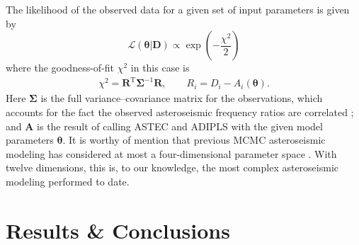 \documentclass[twocolumn]{aastex63}
\newif\ifref
\newcommand{\mb}[1]{\ifref\textcolor{darkred}{#1}\else #1\fi}
\newif\ifreff
\newcommand{\mbb}[1]{\ifreff\textcolor{darkred}{#1}\else #1\fi}
\begin{document}
The likelihood of the observed data for a given set of input parameters is given by
\begin{equation}
    \mathcal{L}(\boldsymbol\theta | \boldsymbol D) 
    \propto 
    \exp\left(-\frac{\chi^2}{2}\right)
\end{equation}
where the goodness-of-fit $\chi^2$ in this case is
\begin{align}
    \chi^2
    = %
    \mathbf{R}^{\text{T}} \boldsymbol{\Sigma}^{-1} \mathbf{R}%
    ,\qquad %
    R_i 
    = %
    D_i - A_i(\boldsymbol \theta). \label{eq:chi2}
\end{align}
Here $\mathbf \Sigma$ %
is the full variance--covariance matrix for the observations, which accounts for the fact the observed asteroseismic frequency ratios are correlated \citep{2018arXiv180807556R}; and $\mathbf A$ is the result of calling ASTEC and ADIPLS with the given model parameters $\boldsymbol \theta$. 
\mbb{It is worthy of mention that previous MCMC asteroseismic modeling has considered at most a four-dimensional parameter space \citep[see, e.g.,][]{2012MNRAS.427.1847B, 2018ASSP...49..149L, 2019MNRAS.484..771R}. 
With twelve dimensions, this is, to our knowledge, the most complex asteroseismic modeling performed to date.}

\section{Results \& Conclusions} 
\end{document}
